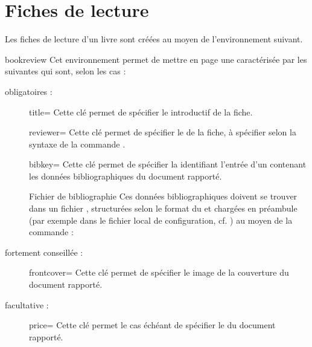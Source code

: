 \documentclass{letgut}
\begin{document}
\section{Fiches de lecture}
\label{sec:fiches-de-lecture}

Les fiches de lecture d'un livre sont créées au moyen de l'environnement
 suivant.

\begin{docEnvironment}[doclang/environment content=fiche de lecture]{bookreview}{}
  Cet environnement permet de mettre en page une 
  caractérisée par les  suivantes qui sont, selon les
  cas :
  \begin{description}
  \item[obligatoires :]
    \begin{docKey}{title}{=}{\valinitdef}
      Cette clé permet de spécifier le  introductif de la fiche.
    \end{docKey}
    \begin{docKey}{reviewer}{=}{\valinitdef}
      Cette clé permet de spécifier le  de la fiche, à spécifier
      selon la syntaxe de la commande .
    \end{docKey}
    \begin{docKey}{bibkey}{=}{\valinitdef}
      Cette clé permet de spécifier la  identifiant l'entrée d'un
       contenant les données bibliographiques du document rapporté.
      \begin{dbwarning}{Fichier de bibliographie}{}
        Ces données bibliographiques doivent se trouver dans un fichier
        , structurées selon le format du
         et chargées en préambule (par exemple dans le
        fichier local de configuration, cf. ) au
        moyen de la commande :
\begin{ltx-code}
£.bib}
\end{ltx-code}
      \end{dbwarning}
    \end{docKey}
  \item[fortement conseillée :]
    \begin{docKey}{frontcover}{=}{\valinitdef}
      Cette clé permet de spécifier le  image de la couverture du
      document rapporté.
    \end{docKey}
  \item[facultative :]
    \begin{docKey}{price}{=}{\valinitdef}
      Cette clé permet le cas échéant de spécifier le  du document rapporté.
    \end{docKey}
  \end{description}
\end{docEnvironment}
\end{document}
